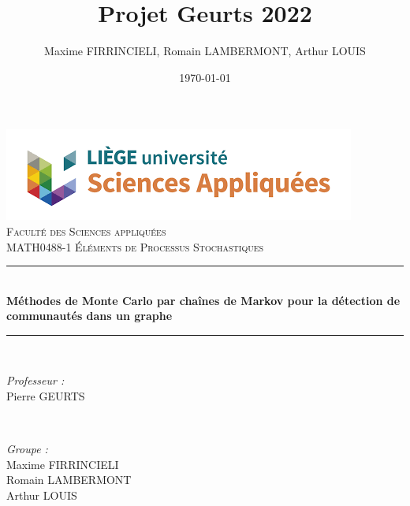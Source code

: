 \documentclass[11pt]{article}
\begin{document}

\title{Projet Geurts 2022}								%
\author{Maxime FIRRINCIELI, Romain LAMBERMONT, Arthur LOUIS}								%
\date{\today}											%

\makeatletter
\let\thetitle\@title
\let\theauthor\@author
\let\thedate\@date
\makeatother

\pagestyle{fancy}
\fancyhf{}
\rhead{\theauthor}
\lhead{\thetitle}
\cfoot{\thepage}

\begin{titlepage}
 \centering
 \vspace*{0.5 cm}
 \includegraphics[scale = 0.7]{figs/facsa.png}\\[1.0 cm]	%
 \textsc{\LARGE \newline\newline Faculté des Sciences appliquées}\\[2.0 cm]	%
 \textsc{\Large MATH0488-1 Éléments de Processus Stochastiques}\\[0.5 cm]				%
 \rule{\linewidth}{0.2 mm} \\[0.4 cm]
 {\huge \bfseries Méthodes de Monte Carlo par chaînes de Markov pour la détection de communautés dans un graphe}\\
 \rule{\linewidth}{0.2 mm} \\[1.5 cm]

 \begin{minipage}{0.5\textwidth}
 	\begin{flushleft} \large
 		\emph{Professeur :}\\
 		  Pierre GEURTS\\
    \vspace{0.5cm}
 		\end{flushleft}
 		\end{minipage}~
 		\begin{minipage}{0.4\textwidth}

 		\begin{flushright} \large
 		\emph{Groupe :} \\
      Maxime FIRRINCIELI\\
      Romain LAMBERMONT\\
      Arthur LOUIS\\
 	\end{flushright}

 \end{minipage}\\[2 cm]


 \thedate
\end{titlepage}
\end{document}
